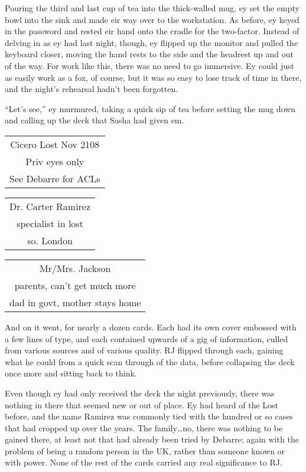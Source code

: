 Pouring the third and last cup of tea into the thick-walled mug, ey set the empty bowl into the sink and made eir way over to the workstation.  As before, ey keyed in the password and rested eir hand onto the cradle for the two-factor.  Instead of delving in as ey had last night, though, ey flipped up the monitor and pulled the keyboard closer, moving the hand rests to the side and the headrest up and out of the way.  For work like this, there was no need to go immersive.  Ey could just as easily work as a fox, of course, but it was so easy to lose track of time in there, and the night's rehearsal hadn't been forgotten.

``Let's see,'' ey murmured, taking a quick sip of tea before setting the mug down and calling up the deck that Sasha had given em.

\begin{tabular}{| c |}
  \hline
  Cicero Lost Nov 2108\\
  Priv eyes only\\
  See Debarre for ACLs\\
  \hline
\end{tabular}
\begin{tabular}{| c |}
  \hline
  Dr. Carter Ramirez\\
  specialist in lost\\
  so. London\\
  \hline
\end{tabular}
\begin{tabular}{| c |}
  \hline
  Mr/Mrs. Jackson\\
  parents, can't get much more\\
  dad in govt, mother stays home\\
  \hline
\end{tabular}

And on it went, for nearly a dozen cards.  Each had its own cover embossed with a few lines of type, and each contained upwards of a gig of information, culled from various sources and of various quality.  RJ flipped through each, gaining what he could from a quick scan through of the data, before collapsing the deck once more and sitting back to think.

Even though ey had only received the deck the night previously, there was nothing in there that seemed new or out of place.  Ey had heard of the Lost before, and the name Ramirez was commonly tied with the hundred or so cases that had cropped up over the years.  The family\ldots{}no, there was nothing to be gained there, at least not that had already been tried by Debarre; again with the problem of being a random person in the UK, rather than someone known or with power.  None of the rest of the cards carried any real significance to RJ.

